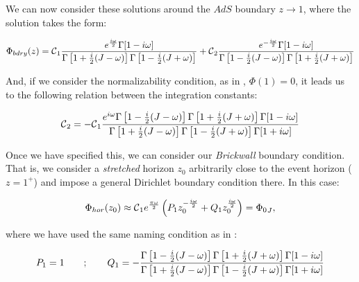 \documentclass[11pt,a4paper]{article}
\begin{document}
We can now consider these solutions around the $AdS$ boundary $z\rightarrow 1$, where the solution takes the form:

\begin{equation}
    \Phi_{bdry}(z) = \mbox{${\cal C}$}_1\frac{e^{\frac{i\omega}{2}}\Gamma[1-i\omega]}{\Gamma\left[1+\frac{i}{2}(J-\omega)\right]\Gamma\left[1-\frac{i}{2}(J+\omega)\right]} + \mbox{${\cal C}$}_2\frac{e^{-\frac{i\omega}{2}}\Gamma[1-i\omega]}{\Gamma\left[1-\frac{i}{2}(J-\omega)\right]\Gamma\left[1+\frac{i}{2}(J+\omega)\right]}
\end{equation}

{\noindent And, if we consider the normalizability condition, as in \cite{Jeong_2025,Das_2023,das2023fuzzballsrandommatrices}, $\Phi(1)=0$, it leads us to the following relation between the integration constants:}

\begin{equation}
    \mbox{${\cal C}$}_2 = -\mbox{${\cal C}$}_1\frac{e^{i\omega}\Gamma\left[1-\frac{i}{2}(J-\omega)\right]\Gamma\left[1+\frac{i}{2}(J+\omega)\right]\Gamma[1-i\omega]}{\Gamma\left[1+\frac{i}{2}(J-\omega)\right]\Gamma\left[1-\frac{i}{2}(J+\omega)\right]\Gamma[1+i\omega]}
\end{equation}

Once we have specified this, we can consider our \textit{Brickwall} boundary condition. That is, we consider a \textit{stretched} horizon $z_0$ arbitrarily close to the event horizon ($z=1^+$) and impose a general Dirichlet boundary condition there. In this case:

\begin{equation}\LA{BOUNDARY_BTZ}
    \Phi_{hor}(z_0)\approx \calc_1 e^{\frac{\pi\w}{2}}\left(P_1 z_0^{-\frac{i\w}{2}}+Q_1 z_0^{\frac{i\w}{2}}\right) = {\Phi_0}_J,
\end{equation}

{\noindent where we have used the same naming condition as in \cite{Jeong_2025}:}

\begin{equation}
    P_1 = 1 ~~~~~~ ; ~~~~~~ Q_1 = - \frac{\Gamma\left[1-\frac{i}{2}(J-\omega)\right]\Gamma\left[1+\frac{i}{2}(J+\omega)\right]\Gamma[1-i\omega]}{\Gamma\left[1+\frac{i}{2}(J-\omega)\right]\Gamma\left[1-\frac{i}{2}(J+\omega)\right]\Gamma[1+i\omega]}
\end{equation}
\end{document}
